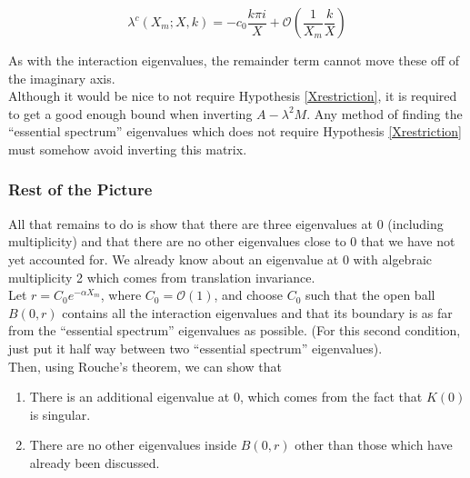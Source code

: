 \documentclass[12pt]{article}
\begin{document}
\[
\lambda^c(X_m; X, k) = -c_0 \frac{k \pi i}{X} + \mathcal{O}\left( \frac{1}{X_m} \frac{k}{X} \right)
\]

As with the interaction eigenvalues, the remainder term cannot move these off of the imaginary axis.\\

Although it would be nice to not require Hypothesis \ref{Xrestriction}, it is required to get a good enough bound when inverting $A - \lambda^2 M$. Any method of finding the ``essential spectrum'' eigenvalues which does not require Hypothesis \ref{Xrestriction} must somehow avoid inverting this matrix. 

\subsubsection{Rest of the Picture}

All that remains to do is show that there are three eigenvalues at 0 (including multiplicity) and that there are no other eigenvalues close to 0 that we have not yet accounted for. We already know about an eigenvalue at 0 with algebraic multiplicity 2 which comes from translation invariance.\\

Let $r = C_0 e^{-\alpha X_m}$, where $C_0 = \mathcal{O}(1)$, and choose $C_0$ such that the open ball $B(0, r)$ contains all the interaction eigenvalues and that its boundary is as far from the ``essential spectrum'' eigenvalues as possible. (For this second condition, just put it half way between two ``essential spectrum'' eigenvalues).\\

Then, using Rouche's theorem, we can show that

\begin{enumerate}
\item There is an additional eigenvalue at 0, which comes from the fact that $K(0)$ is singular.
\item There are no other eigenvalues inside $B(0, r)$ other than those which have already been discussed.
\end{enumerate}
\end{document}
